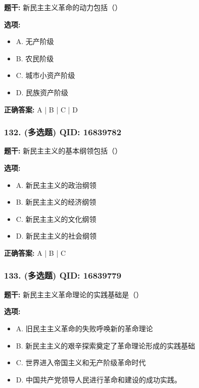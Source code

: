 \documentclass[12pt,UTF8]{ctexart}
\begin{document}
\textbf{题干:}
新民主主义革命的动力包括（）

\textbf{选项:}
\begin{itemize}[leftmargin=*]

  \item A. 无产阶级

  \item B. 农民阶级

  \item C. 城市小资产阶级

  \item D. 民族资产阶级

\end{itemize}

\textbf{正确答案:}
A | B | C | D

\vspace{0.3em}\hrulefill\vspace{0.7em}

\subsubsection*{132. (多选题) \small QID: 16839782}

\textbf{题干:}
新民主主义的基本纲领包括（）

\textbf{选项:}
\begin{itemize}[leftmargin=*]

  \item A. 新民主主义的政治纲领

  \item B. 新民主主义的经济纲领

  \item C. 新民主主义的文化纲领

  \item D. 新民主主义的社会纲领

\end{itemize}

\textbf{正确答案:}
A | B | C

\vspace{0.3em}\hrulefill\vspace{0.7em}

\subsubsection*{133. (多选题) \small QID: 16839779}

\textbf{题干:}
新民主主义革命理论的实践基础是（）

\textbf{选项:}
\begin{itemize}[leftmargin=*]

  \item A. 旧民主主义革命的失败呼唤新的革命理论

  \item B. 新民主主义的艰辛探索奠定了革命理论形成的实践基础

  \item C. 世界进入帝国主义和无产阶级革命时代

  \item D. 中国共产党领导人民进行革命和建设的成功实践。

\end{itemize}
\end{document}
